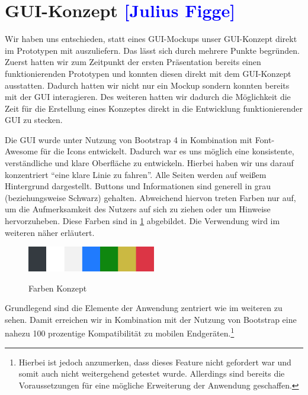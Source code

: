 

\section{GUI-Konzept \textcolor{blue}{[Julius Figge]}}

Wir haben uns entschieden, statt eines GUI-Mockups unser GUI-Konzept direkt im Prototypen mit auszuliefern.
Das lässt sich durch mehrere Punkte begründen.
Zuerst hatten wir zum Zeitpunkt der ersten Präsentation bereits einen funktionierenden Prototypen und konnten diesen direkt mit dem GUI-Konzept ausstatten. Dadurch hatten wir nicht nur ein Mockup sondern konnten bereits mit der GUI interagieren.
Des weiteren hatten wir dadurch die Möglichkeit die Zeit für die Erstellung eines Konzeptes direkt in die Entwicklung funktionierender GUI zu stecken.

Die GUI wurde unter Nutzung von Bootstrap 4 in Kombination mit Font-Awesome für die Icons entwickelt.
Dadurch war es uns möglich eine konsistente, verständliche und klare Oberfläche zu entwickeln.
Hierbei haben wir uns darauf konzentriert \enquote{eine klare Linie zu fahren}. Alle Seiten werden auf weißem Hintergrund dargestellt. Buttons und Informationen sind generell in grau (beziehungsweise Schwarz) gehalten.
Abweichend hiervon treten Farben nur auf, um die Aufmerksamkeit des Nutzers auf sich zu ziehen oder um Hinweise hervorzuheben. Diese Farben sind in \cref{fig:farbmuster} abgebildet. Die Verwendung wird im weiteren näher erläutert.

\begin{figure}[h!!]
    \centering
    \begin{minipage}[t]{1\textwidth}
        \caption{Farben Konzept}
        \includegraphics[width=0.5\textwidth]{img/Farbmuster.png}\\
        \label{fig:farbmuster}
    \end{minipage}
\end{figure}


Grundlegend sind die Elemente der Anwendung zentriert wie im weiteren zu sehen. Damit erreichen wir in Kombination mit der Nutzung von Bootstrap eine nahezu 100 prozentige Kompatibilität zu mobilen Endgeräten.\footnote{Hierbei ist jedoch anzumerken, dass dieses Feature nicht gefordert war und somit auch nicht weitergehend getestet wurde. Allerdings sind bereits die Voraussetzungen für eine mögliche Erweiterung der Anwendung geschaffen.}

